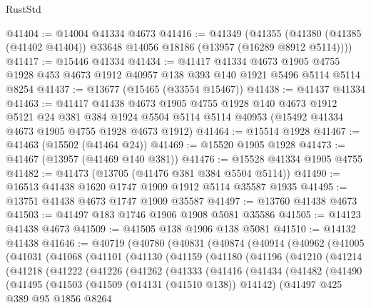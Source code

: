 \begin{lexlean}{RustStd}
\begin{coremodule}
@41404 := @14004 @41334 @4673
@41416 := @41349
    (@41355 (@41380 (@41385 (@41402 @41404)) @33648 @14056 @18186 (@13957 (@16289 @8912 @5114))))
@41417 := @15446 @41334
@41434 := @41417
    @41334
    @4673
    @1905
    @4755
    @1928
    @453
    @4673
    @1912
    @40957
    @138
    @393
    @140
    @1921
    @5496
    @5114
    @5114
    @8254
@41437 := @13677 (@15465 (@33554 @15467))
@41438 := @41437 @41334
@41463 := @41417
    @41438
    @4673
    @1905
    @4755
    @1928
    @140
    @4673
    @1912
    @5121
    @24
    @381
    @384
    @1924
    @5504
    @5114
    @5114
    @40953
    (@15492 @41334 @4673 @1905 @4755 @1928 @4673 @1912)
@41464 := @15514 @1928
@41467 := @41463 (@15502 (@41464 @24))
@41469 := @15520 @1905 @1928
@41473 := @41467 (@13957 (@41469 @140 @381))
@41476 := @15528 @41334 @1905 @4755
@41482 := @41473 (@13705 (@41476 @381 @384 @5504 @5114))
@41490 := @16513 @41438 @1620 @1747 @1909 @1912 @5114 @35587 @1935
@41495 := @13751 @41438 @4673 @1747 @1909 @35587
@41497 := @13760 @41438 @4673
@41503 := @41497 @183 @1746 @1906 @1908 @5081 @35586
@41505 := @14123 @41438 @4673
@41509 := @41505 @138 @1906 @138 @5081
@41510 := @14132 @41438
@41646 := @40719
    (@40780
      (@40831
        (@40874
          (@40914
            (@40962
              (@41005
                (@41031
                  (@41068
                    (@41101
                      (@41130
                        (@41159
                          (@41180
                            (@41196
                              (@41210
                                (@41214
                                  (@41218
                                    (@41222
                                      (@41226
                                        (@41262
                                          (@41333
                                            (@41416
                                              (@41434
                                                (@41482
                                                  (@41490
                                                    (@41495
                                                      (@41503
                                                        (@41509 (@14131 (@41510 @138)) @14142)
                                                        (@41497
                                                          @425
                                                          @389
                                                          @95
                                                          @1856
                                                          @8264

\end{coremodule}
\end{lexlean}
